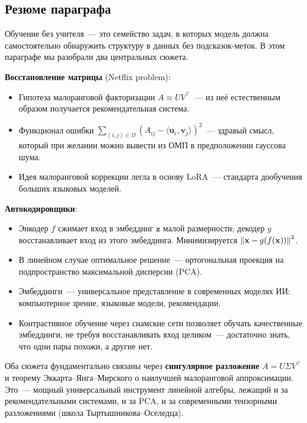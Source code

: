 \subsection{Резюме параграфа}

Обучение без учителя~--- это семейство задач, в которых модель должна
самостоятельно обнаружить структуру в данных без подсказок-меток.
В этом параграфе мы разобрали два центральных сюжета.

\textbf{Восстановление матрицы} (Netflix problem):
\begin{itemize}\itemsep1pt
  \item Гипотеза малоранговой факторизации $A\approx UV^{\top}$~--- из
        неё естественным образом получается рекомендательная система.
  \item Функционал ошибки $\sum_{(i,j)\in\Omega}(A_{ij}-\langle\mathbf u_i,\mathbf v_j\rangle)^{2}$~---
        здравый смысл, который при желании можно вывести из ОМП в
        предположении гауссова шума.
  \item Идея малоранговой коррекции легла в основу LoRA~--- стандарта
        дообучения больших языковых моделей.
\end{itemize}

\textbf{Автокодировщики}:
\begin{itemize}\itemsep1pt
  \item Энкодер $f$ сжимает вход в эмбеддинг $\mathbf z$ малой
        размерности; декодер $g$ восстанавливает вход из этого эмбеддинга.
        Минимизируется $\left\|\mathbf x-g(f(\mathbf x))\right\|^{2}$.
  \item В линейном случае оптимальное решение~--- ортогональная
        проекция на подпространство максимальной дисперсии (PCA).
  \item Эмбеддинги~--- универсальное представление в современных
        моделях ИИ: компьютерное зрение, языковые модели, рекомендации.
  \item Контрастивное обучение через сиамские сети позволяет
        обучать качественные эмбеддинги, не требуя восстанавливать
        вход целиком~--- достаточно знать, что одни пары похожи, а
        другие нет.
\end{itemize}

Оба сюжета фундаментально связаны через \textbf{сингулярное
разложение} $A=U\Sigma V^{\top}$ и теорему Эккарта--Янга--Мирского
о наилучшей малоранговой аппроксимации. Это~--- мощный
универсальный инструмент линейной алгебры, лежащий и за
рекомендательными системами, и за PCA, и за современными
тензорными разложениями (школа Тыртышникова--Оселедца).


